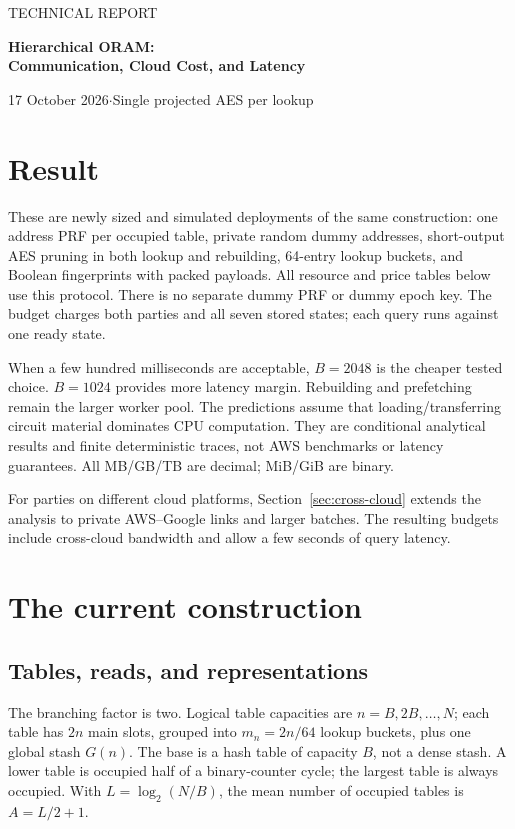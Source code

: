 \documentclass[11pt]{article}
\begin{document}
{\color{teal}\large TECHNICAL REPORT\par}
{\color{navy}\LARGE\bfseries Hierarchical ORAM:\\Communication, Cloud Cost, and Latency\par}
17 October 2026\quad$\cdot$\quad Single projected AES per lookup

\section*{Result}


These are newly sized and simulated deployments of the same construction:
one address PRF per occupied table, private random dummy addresses,
short-output AES pruning in both lookup and rebuilding, 64-entry lookup
buckets, and Boolean fingerprints with packed payloads. All resource and
price tables below use this protocol. There is no separate dummy PRF or
dummy epoch key. The budget charges both parties and all seven stored
states; each query runs against one ready state.

When a few hundred milliseconds are acceptable, $B=2048$ is the cheaper
tested choice. $B=1024$ provides more latency margin. Rebuilding and
prefetching remain the larger worker pool. The predictions assume that
loading/transferring circuit material dominates CPU computation. They are
conditional analytical results and finite deterministic traces, not AWS
benchmarks or latency guarantees. All MB/GB/TB are decimal; MiB/GiB are binary.

For parties on different cloud platforms, Section~\ref{sec:cross-cloud}
extends the analysis to private AWS--Google links and larger batches.
The resulting budgets include cross-cloud bandwidth and allow a few
seconds of query latency.

\section{The current construction}
\subsection{Tables, reads, and representations}
The branching factor is two. Logical table capacities are
$n=B,2B,\ldots,N$; each table has $2n$ main slots, grouped into
$m_n=2n/64$ lookup buckets, plus one global stash $G(n)$. The base is a
hash table of capacity $B$, not a dense stash. A lower table is occupied
half of a binary-counter cycle; the largest table is always occupied.
With $L=\log_2(N/B)$, the mean number of occupied tables is $A=L/2+1$.
\end{document}
